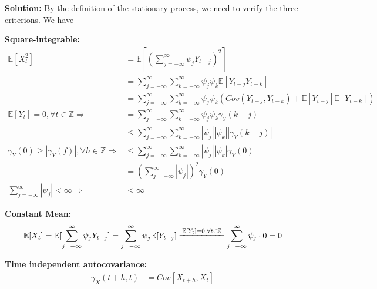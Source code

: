 \documentclass[11pt]{article}
\theoremstyle{plain} %
\newenvironment{solution}
{\color{C2}\normalfont\begin{framed}\begingroup\textbf{Solution:} }
  {\endgroup\end{framed}}
\theoremstyle{remark}
\newcommand{\EE}{\mathbb{E}}
\begin{document}
\begin{solution}
	By the definition of the stationary process, we need to verify the three criterions. We have
	\begin{enumerate}[label=(\roman*)]{
		\item  \textbf{Square-integrable:}
		      \begin{align*}
			      \EE[X_{t}^{2}] & = \EE[(\sum_{j=-\infty}^{\infty} \psi_{j} Y_{t-j})^{2}]                                                                          \\
			                     & = \sum_{j=-\infty}^{\infty}\sum_{k=-\infty}^{\infty}\psi_{j}\psi_{k}\EE[Y_{t-j}Y_{t-k}]                                          \\
			                     & =\sum_{j=-\infty}^{\infty}\sum_{k=-\infty}^{\infty}\psi_{j}\psi_{k}\left(Cov(Y_{t-j}, Y_{t-k}) + \EE[Y_{t-j}]\EE[Y_{t-k}]\right) \\
			      \EE[Y_{t}] = 0, \forall t\in \mathbb{Z} \Longrightarrow
			                     & = \sum_{j=-\infty}^{\infty}\sum_{k=-\infty}^{\infty}\psi_{j}\psi_{k}\gamma_{Y}(k-j)                                              \\
			                     & \le \sum_{j=-\infty}^{\infty}\sum_{k=-\infty}^{\infty}|\psi_{j}||\psi_{k}||\gamma_{Y}(k-j)|                                      \\
			      \gamma_{Y}(0)\ge |\gamma_{Y}(f)|, \forall h\in \mathbb{Z} \Longrightarrow
			                     & \le \sum_{j=-\infty}^{\infty}\sum_{k=-\infty}^{\infty}|\psi_{j}||\psi_{k}|\gamma_{Y}(0)                                          \\
			                     & = \left(\sum_{j=-\infty}^{\infty}|\psi_{j}|\right)^{2}\gamma_{Y}(0)                                                              \\
			      \sum_{j=-\infty}^{\infty}\left|\psi_{j}\right|<\infty\Longrightarrow
			                     & <\infty
		      \end{align*}
		\item \textbf{Constant Mean:}
		      $$
			      \EE[X_{t}] = \EE[\sum_{j=-\infty}^{\infty} \psi_{j} Y_{t-j}] = \sum_{j=-\infty}^{\infty} \psi_{j} \EE[Y_{t-j}] \xlongequal{\EE[Y_{t}] = 0, \forall t\in \mathbb{Z}} \sum_{j=-\infty}^{\infty} \psi_{j} \cdot 0 = 0
		      $$
		\item \textbf{Time independent autocovariance:}
		      \begin{align*}
			      \gamma_{X}(t+h,t) & = Cov[X_{t+h}, X_{t}]                                                                                                               \\

\end{align*}}
\end{enumerate}
\end{solution}
\end{document}
